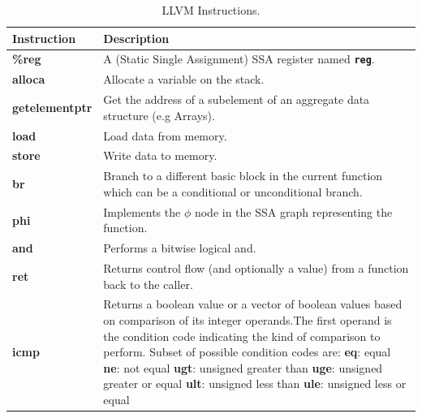{\renewcommand{\arraystretch}{1.5}%
\begin{table}[H]
\centering
\small
\begin{tabularx}{\textwidth}{|l|X|}
\hline
Instruction        & Description  \\
\hline
\textbf{\%reg} & A (Static Single Assignment) SSA register named \texttt{\textbf{reg}}.\\
\hline
\textbf{alloca} & Allocate a variable on the stack.\\
\hline
\textbf{getelementptr} & Get the address of a subelement of an aggregate data structure (e.g Arrays).\\
\hline
\textbf{load} & Load data from memory.\\
\hline
\textbf{store} & Write data to memory.\\
\hline
\textbf{br} & Branch to a different basic block in the current function which can be a conditional or unconditional branch. \\
\hline
\textbf{phi} & Implements the $\phi$ node in the SSA graph representing the function.\\
\hline
\textbf{and} & Performs a bitwise logical and.\\
\hline
\textbf{ret} & Returns control flow (and optionally a value) from a function back to the caller.\\
\hline
\textbf{icmp} &
Returns a boolean value or a vector of boolean values based on comparison of its integer operands.The first operand is the condition code indicating the kind of comparison to perform. Subset of possible condition codes are:\newline
\textbf{eq}: equal\newline
\textbf{ne}: not equal\newline
\textbf{ugt}: unsigned greater than\newline
\textbf{uge}: unsigned greater or equal\newline
\textbf{ult}: unsigned less than\newline
\textbf{ule}: unsigned less or equal\newline
\\
\hline
\end{tabularx}
\caption[LLVM Instructions]{LLVM Instructions.}\label{tab:llvminst}
\end{table}}


